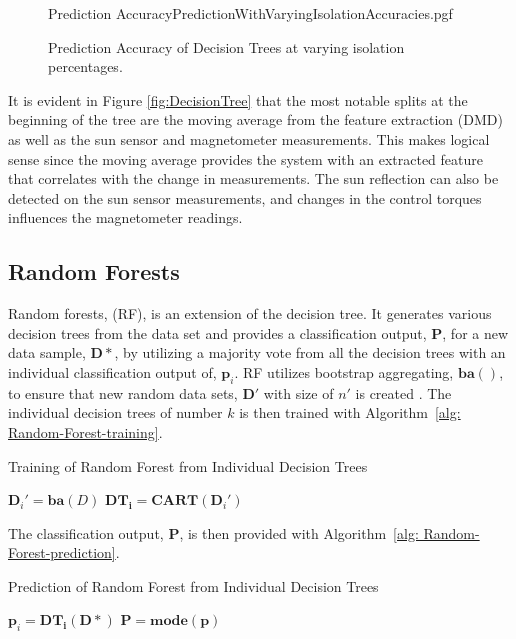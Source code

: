 \begin{figure}[!htb]
	\centering
	{Prediction AccuracyPredictionWithVaryingIsolationAccuracies.pgf}
	
	\caption{Prediction Accuracy of Decision Trees at varying isolation percentages.}
	\label{fig:DecisionTreesWithVaryingIsolationPrediction}
\end{figure}


It is evident in Figure \ref{fig:DecisionTree} that the most notable splits at the beginning of the tree are the moving average from the feature extraction (DMD) as well as the sun sensor and magnetometer measurements. This makes logical sense since the moving average provides the system with an extracted feature that correlates with the change in measurements. The sun reflection can also be detected on the sun sensor measurements, and changes in the control torques influences the magnetometer readings.

\subsection{Random Forests}
Random forests, (RF), is an extension of the decision tree. It generates various decision trees from the data set and provides a classification output, $\mathbf{P}$, for a new data sample, $\mathbf{D}*$, by utilizing a majority vote from all the decision trees with an individual classification output of, $\mathbf{p}_i$. RF utilizes bootstrap aggregating, $\mathbf{ba}()$, to ensure that new random data sets, $\mathbf{D}'$ with size of $n'$ is created \cite{Primartha2018, Paul2018, Shi2006}. The individual decision trees of number $k$ is then trained with Algorithm~\ref{alg: Random-Forest-training}.

\begin{algorithm}[!htb]
	\caption[Random Forest]{Training of Random Forest from Individual Decision Trees}
	\label{alg: Random-Forest-training}
	\begin{algorithmic}[1]
		\State \texttt{$\mathbf{D}_i' = \mathbf{ba}(D)$}
		\State \texttt{$\mathbf{DT_i} = \mathbf{CART}(\mathbf{D}_i')$}
		\EndFor
	\end{algorithmic}
\end{algorithm}
The classification output, $\mathbf{P}$, is then provided with Algorithm~\ref{alg: Random-Forest-prediction}.
\begin{algorithm}[!htb]
	\caption[Random Forest]{Prediction of Random Forest from Individual Decision Trees}
	\label{alg: Random-Forest-prediction}
	\begin{algorithmic}[1]
	\State \texttt{$\mathbf{p}_i = \mathbf{DT_i}(\mathbf{D}*)$}
	\EndFor
	\State $\mathbf{P} = \textbf{mode}(\mathbf{p})$
	\end{algorithmic}
\end{algorithm}

